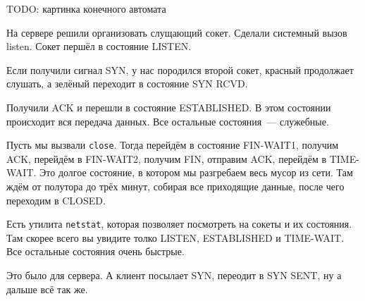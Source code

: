 TODO: картинка конечного автомата

На сервере решили организовать слущающий сокет. Сделали системный вызов listen. Сокет першёл в состояние LISTEN.

Если получили сигнал SYN, у нас породился второй сокет, красный продолжает слушать, а зелёный переходит в состояние SYN RCVD.

Получили ACK и перешли в состояние ESTABLISHED. В этом состоянии происходит вся передача данных. Все остальные состояния~--- служебные.

Пусть мы вызвали {\tt close}. Тогда перейдём в состояние FIN-WAIT1, получим ACK, перейдём в FIN-WAIT2, получим FIN, отправим ACK, перейдём в TIME-WAIT. Это долгое состояние, в котором мы разгребаем весь мусор из сети. Там ждём от полутора до трёх минут, собирая все приходящие данные, после чего переходим в CLOSED.

Есть утилита {\tt netstat}, которая позволяет посмотреть на сокеты и их состояния. Там скорее всего вы увидите толко LISTEN, ESTABLISHED и TIME-WAIT. Все остальные состояния очень быстрые.

Это было для сервера. А клиент посылает SYN, переодит в SYN SENT, ну а дальше всё так же.
